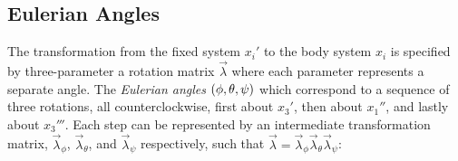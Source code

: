 \subsection{Eulerian Angles}
The transformation from the fixed system $x_i'$ to the body system $x_i$ is specified by three-parameter a rotation matrix $\vec{\lambda}$ where each parameter represents a separate angle. The \textit{Eulerian angles} $\left(\phi,\theta,\psi\right)$ which correspond to a sequence of three rotations, all counterclockwise, first about $x_3'$, then about $x_1''$, and lastly about $x_3'''$. Each step can be represented by an intermediate transformation matrix, $\vec{\lambda}_{\phi}$, $\vec{\lambda}_{\theta}$, and $\vec{\lambda}_{\psi}$ respectively, such that $\vec{\lambda} = \vec{\lambda}_{\phi}\vec{\lambda}_{\theta}\vec{\lambda}_{\psi}$:
\eqn{\vec{\lambda} = 
\begin{pmatrix}
	\cos{\psi}\cos{\phi}-\cos{\theta}\sin{\phi}\sin{\psi} & \cos{\psi}\sin{\phi}+\cos{\theta}\cos{\phi}\sin{\psi} & \sin{\psi}\sin{\theta} \\
	-\sin{\psi}\cos{\phi}-\cos{\theta}\sin{\phi}\cos{\psi} & -\sin{\psi}\sin{\phi}+\cos{\theta}\cos{\phi}\cos{\psi} & \cos{\psi}\sin{\theta} \\
	\sin{\theta}\sin{\phi} & -\sin{\theta}\cos{\phi} & \cos{\theta}
\end{pmatrix}
}
\newpage
